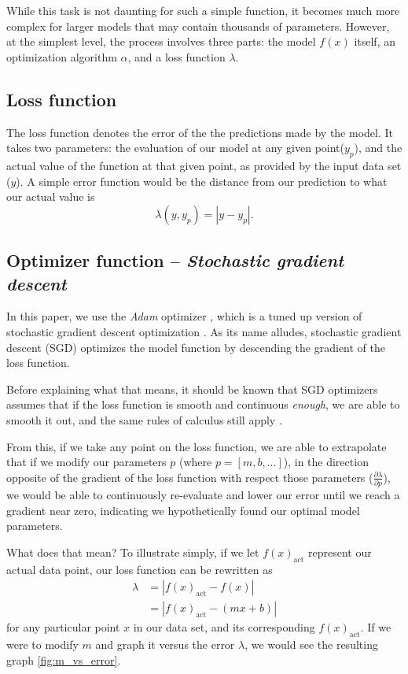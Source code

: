 \documentclass[titlepage,letterpaper]{article}
\begin{document}
While this task is not daunting for such a simple function, it becomes much more complex for larger models that may contain thousands of parameters. However, at the simplest level, the process involves three parts: the model $f(x)$ itself, an optimization algorithm $\alpha$,  and a loss function $\lambda$.


\subsection{Loss function}

The loss function denotes the error of the the predictions made by the model. It takes two parameters: the evaluation of our model at any given point($y_p$), and the actual value of the function at that given point, as provided by the input data set ($y$). A simple error function would be the distance from our prediction to what our actual value is
\[\lambda(y,y_p) =  |y - y_p|. \]  


\subsection{Optimizer function -- \textit{Stochastic gradient descent}}

In this paper, we use the \textit{Adam} optimizer \cite{adam}, which is a tuned up version of stochastic gradient descent optimization \cite{adam}. As its name alludes, stochastic gradient descent (SGD) optimizes the model function by descending the gradient of the loss function. 

Before explaining what that means, it should be known that SGD optimizers assumes  that if the loss function is smooth and continuous \textit{enough}, we are able to smooth it out, and the same rules of calculus still apply \cite{adam}.

From this, if we take any point on the loss function, we are able to extrapolate that if we modify our parameters \(p\) (where $p = [m, b,...]$), in the direction opposite of the gradient of the loss function with respect those parameters ($\frac{\partial\lambda}{\partial p}$), we would be able to continuously re-evaluate and lower our error until we reach a gradient near zero, indicating we hypothetically found our optimal model parameters.

What does that mean? To illustrate simply, if we let $f(x)_{\text{act}}$ represent our actual data point, our loss function can be rewritten as 
\begin{align}
\lambda &=  |f(x)_{\text{act}} - f(x)| \nonumber\\
&= | f(x)_{\text{act}} -  (mx + b)\label{eq1}|
\end{align}
for any particular point $x$ in our data set, and its corresponding $f(x)_{\text{act}}$. If we were to modify  $m$  and graph it versus the error $\lambda$, we would see the resulting graph \cref{fig:m_vs_error}. 
\end{document}
